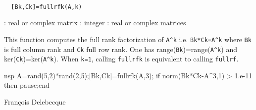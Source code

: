 
\begin{mandesc}
   \\ %
\end{mandesc}
\begin{calling_sequence}
\begin{verbatim}
  [Bk,Ck]=fullrfk(A,k)  
\end{verbatim}
\end{calling_sequence}
\begin{parameters}
  \begin{varlist}
    : real or complex matrix
    : integer
    : real or complex matrices
  \end{varlist}
\end{parameters}
\begin{mandescription}
  This function computes the full rank factorization of \verb!A^k! i.e.
  \verb!Bk*Ck=A^k! where \verb!Bk! is full column rank and \verb!Ck! full row rank.
  One has range(\verb!Bk!)=range(\verb!A^k!) and ker(\verb!Ck!)=ker(\verb!A^k!).
  When \verb!k=1!, calling \verb!fullrfk! is equivalent to calling \verb!fullrf!.
\end{mandescription}
\begin{examples}
  \begin{mintednsp}{nsp}
    A=rand(5,2)*rand(2,5);[Bk,Ck]=fullrfk(A,3);
    if norm(Bk*Ck-A^3,1) > 1.e-11 then pause;end
  \end{mintednsp}
\end{examples}
\begin{manseealso}
     
\end{manseealso}
\begin{authors}
  Fran\c{c}ois Delebecque
\end{authors}
